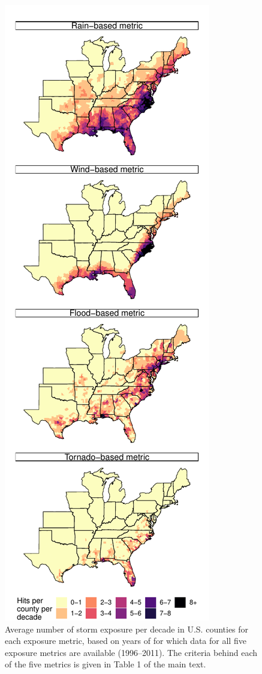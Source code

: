 \documentclass[fleqn,10pt,lineno]{olplainarticle}
\begin{document}
\begin{figure}[tbhp!]
\centering
\includegraphics[width=\linewidth]{figures/averageexposureonlysupp}
\caption{Average number of storm exposure per decade in U.S. counties for each exposure metric, based on years of for which data for all five exposure metrics are available (1996--2011). The criteria behind each of the five metrics is given in Table 1 of the main text.}
\label{fig:averageexposuresupp}
\end{figure}
\end{document}
